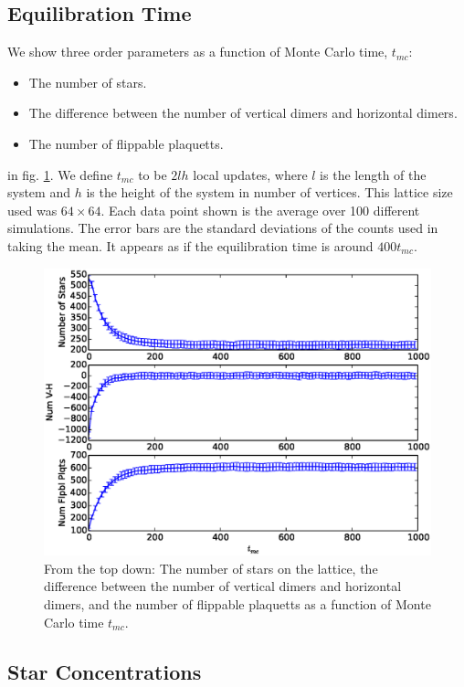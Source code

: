 \documentclass[aps,floatfix,11pt]{revtex4-1}
\begin{document}
\subsection{Equilibration Time}

We show three order parameters as a function of Monte Carlo time, $t_{mc}$: 

\begin{itemize}
    \item The number of stars.
    \item The difference between the number of vertical dimers and horizontal dimers.
    \item The number of flippable plaquetts.
\end{itemize}

\noindent
in fig. \ref{fig:nums_of_things}. We define $t_{mc}$ to be $2lh$ local updates, where $l$ is the length of the system and $h$ is the
height of the system in number of vertices. This lattice size used was $64\times 64$. Each data
point shown is the average over 100 different simulations. The error bars are the standard deviations of
the counts used in taking the mean. It appears as if the equilibration time is around $400t_{mc}$. 

\begin{figure}[h]
    \centering
    \includegraphics[width=8.5 cm]{num_order_params}
    \caption{From the top down: The number of stars on the lattice, the difference between the
    number of vertical dimers and horizontal dimers, and the number of flippable plaquetts as a
    function of Monte Carlo time $t_{mc}$. \label{fig:nums_of_things}}
\end{figure}

\subsection{Star Concentrations}
\end{document}
